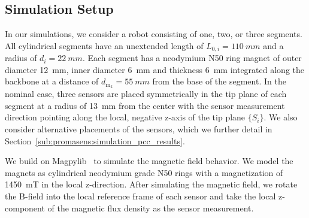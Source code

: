 \subsection{Simulation Setup}\label{sub:promasens:pcc_simulations:simulation_setup}
In our simulations, we consider a robot consisting of one, two, or three segments. %
All cylindrical segments have an unextended length of $L_{0,i} = \SI{110}{mm}$ and a radius of $d_i = \SI{22}{mm}$. Each segment has a neodymium N50 ring magnet of outer diameter \SI{12}{mm}, inner diameter \SI{6}{mm} and thickness \SI{6}{mm} integrated along the backbone at a distance of $d_{\mathrm{m}_k} = \SI{55}{mm}$ from the base of the segment.
In the nominal case, three sensors are placed symmetrically in the tip plane of each segment at a radius of \SI{13}{mm} from the center with the sensor measurement direction pointing along the local, negative z-axis of the tip plane $\{S_i\}$. We also consider alternative placements of the sensors, which we further detail in Section~\ref{sub:promasens:simulation_pcc_results}.

We build on Magpylib~\citep{magpylib2020} to simulate the magnetic field behavior.
We model the magnets as cylindrical neodymium grade N50 rings with a magnetization of \SI{1450}{mT} in the local z-direction. 
After simulating the magnetic field, we rotate the B-field into the local reference frame of each sensor and take the local z-component of the magnetic flux density as the sensor measurement.

